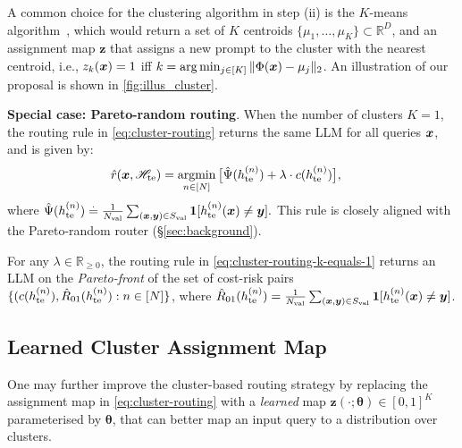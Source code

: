 A common choice for the clustering algorithm in step (ii) is the $K$-means algorithm~\citep{Mac1967}, which would return a set of $K$ centroids $\{\mu_{1},\ldots,\mu_{K}\}\subset\mathbb{R}^{D}$, and an assignment map $\mathbf{z}$ that assigns a new prompt to the cluster with the nearest centroid, i.e., $z_k(\boldsymbol{x})  = 1$ iff $k = \arg\min_{j\in[K]}\|\Phi(\boldsymbol{x})-\mu_{j}\|_{2}$.
\ifarxiv
An illustration of our proposal is shown in \cref{fig:illus_cluster}.
\fi






\textbf{Special case: Pareto-random routing}.
When the number of clusters $K=1$, the  routing rule in \eqref{eq:cluster-routing} returns the same LLM for all queries $\boldsymbol{x}$, and is given by:
\begin{align}
\hat{r}(\boldsymbol{x}, \mathscr{H}_{\mathrm{te}}) & =
\underset{n \in [ N ]}{\operatorname{argmin}} \, \big[ \hat{\Psi}( h_{\mathrm{te}}^{(n)} ) + \lambda\cdot c( h_{\mathrm{te}}^{(n)} ) \big],
\label{eq:cluster-routing-k-equals-1}
\end{align}
where $\hat{\Psi}( h_{\mathrm{te}}^{( n )} ) \stackrel{.}{=}\frac{1}{N_{\rm val}}\sum_{(\boldsymbol{x}, \boldsymbol{y}) \in S_{\rm val}} \bm{1}[h_{\mathrm{te}}^{( n )}(\boldsymbol{x})\ne\boldsymbol{y}].$  
This rule is closely aligned with the Pareto-random router (\S\ref{sec:background}). 

\begin{prop}
{For any $\lambda \in \mathbb{R}_{\geq 0}$, the routing rule in \eqref{eq:cluster-routing-k-equals-1} returns an LLM on the  \emph{Pareto-front} of the set of cost-risk pairs 
$\{(c( h_{\mathrm{te}}^{( n )} ), \hat{R}_{01}( h_{\mathrm{te}}^{( n )} ): n \in [ N ]\}$, 
where 
$\hat{R}_{01}( h_{\mathrm{te}}^{( n )} ) = \frac{1}{N_{\rm val}}\sum_{(\boldsymbol{x}, \boldsymbol{y}) \in S_{\rm val}} \bm{1}[h_{\mathrm{te}}^{( n )}(\boldsymbol{x})\ne\boldsymbol{y}]$.}
\label{prop:cluster-routing-k-equals-1}
\end{prop}












\subsection{Learned Cluster Assignment Map}
\label{sec:two_tower}
One may further improve the cluster-based routing strategy by replacing the assignment map in \eqref{eq:cluster-routing} with a \emph{learned} map
$\mathbf{z}( \cdot; \boldsymbol{\theta} ) \in [ 0, 1 ]^{K}$ 
parameterised by $\boldsymbol{\theta}$,
that can better map an input query to a distribution over clusters. 

